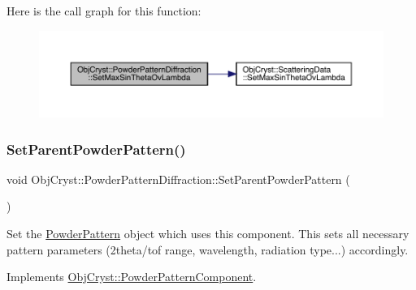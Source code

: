 Here is the call graph for this function\+:
\nopagebreak
\begin{figure}[H]
\begin{center}
\leavevmode
\includegraphics[width=350pt]{class_obj_cryst_1_1_powder_pattern_diffraction_a6eabf890d810833b58a903f70dad5885_cgraph}
\end{center}
\end{figure}
\mbox{\label{class_obj_cryst_1_1_powder_pattern_diffraction_ab72aa94beafb9f7081c0cc5e9adc7050}} 
\subsubsection{\texorpdfstring{SetParentPowderPattern()}{SetParentPowderPattern()}}
{\footnotesize\ttfamily void Obj\+Cryst\+::\+Powder\+Pattern\+Diffraction\+::\+Set\+Parent\+Powder\+Pattern (\begin{DoxyParamCaption}\item[{\mbox{\hyperlink{class_obj_cryst_1_1_powder_pattern}{Powder\+Pattern}} \&}]{ }\end{DoxyParamCaption})\hspace{0.3cm}{\ttfamily [virtual]}}

Set the \mbox{\hyperlink{class_obj_cryst_1_1_powder_pattern}{Powder\+Pattern}} object which uses this component. This sets all necessary pattern parameters (2theta/tof range, wavelength, radiation type...) accordingly. 

Implements \mbox{\hyperlink{class_obj_cryst_1_1_powder_pattern_component_a6b3dc911118c280dbbdcb7fb97acf980}{Obj\+Cryst\+::\+Powder\+Pattern\+Component}}.

